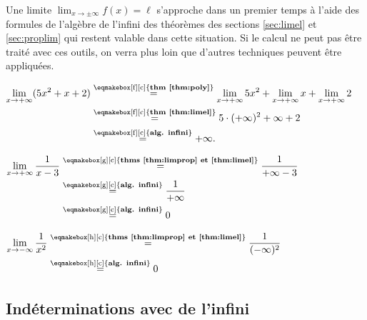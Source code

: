 \documentclass[a4paper,12pt]{article}
\begin{document}
\begin{remarque}
	\tcblower
	Une limite \(\displaystyle{\lim_{x\to\pm\infty}f(x)=\ell}\) s'approche dans un premier temps à l’aide des formules de l'algèbre de l'infini des théorèmes des sections \ref{sec:limel} et \ref{sec:proplim} qui restent valable dans cette situation. Si le calcul ne peut pas être traité avec ces outils, on verra plus loin que d’autres techniques peuvent être appliquées.
\end{remarque}
\begin{exemple}
	\tcblower
	$\begin{aligned}
		\displaystyle{\lim_{x\rightarrow +\infty}(5x^2+x+2)}&\stackrel{\text{\eqmakebox[f][c]{{\bfseries thm \ref{thm:poly}}}}}{=}\displaystyle{\lim_{x\rightarrow +\infty}5x^2}+\displaystyle{\lim_{x\rightarrow +\infty}x}+\displaystyle{\lim_{x\rightarrow +\infty}2}\\
								      &\stackrel{\text{\eqmakebox[f][c]{{\bfseries thm \ref{thm:limel}}}}}{=}5\cdot (+\infty)^2+\infty+2\\
								      &\stackrel{\text{\eqmakebox[f][c]{{\bfseries alg. infini}}}}{=}+\infty.
	\end{aligned}$
\end{exemple}
\begin{exemple}
	\tcblower
$
\begin{aligned}
	\displaystyle{\lim_{x\rightarrow +\infty}\dfrac{1}{x-3}}&\stackrel{\text{\eqmakebox[g][c]{{\bfseries thms \ref{thm:limprop} et \ref{thm:limel}}}}}{=} \dfrac{1}{+\infty-3}\\
								&\stackrel{\text{\eqmakebox[g][c]{{\bfseries alg. infini}}}}{=}\dfrac{1}{+\infty}\\
								&\stackrel{\text{\eqmakebox[g][c]{{\bfseries alg. infini}}}}{=} 0
\end{aligned}
$
\end{exemple}
\begin{exemple}
	\tcblower
	$
	\begin{aligned}
		\displaystyle{\lim_{x\rightarrow -\infty}\dfrac{1}{x^2}}&\stackrel{\text{\eqmakebox[h][c]{{\bfseries thms \ref{thm:limprop} et \ref{thm:limel}}}}}{=}\dfrac{1}{(-\infty)^2}\\
											 &\stackrel{\text{\eqmakebox[h][c]{{\bfseries alg. infini}}}}{=}0
	\end{aligned}
	$
\end{exemple}
\subsection{Indéterminations avec de l'infini}
\end{document}

